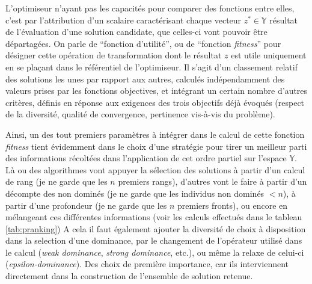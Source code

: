 L'optimiseur n'ayant pas les capacités pour comparer des fonctions entre elles, c'est par l'attribution d'un scalaire caractérisant chaque vecteur $z^* \in \mathbb{Y}$ résultat de l'évaluation d'une solution candidate, que celles-ci vont pouvoir être départagées. On parle de \enquote{fonction d'utilité}, ou de \enquote{fonction \textit{fitness}} pour désigner cette opération de transformation dont le résultat $z$ est utile uniquement en se plaçant dans le référentiel de l'optimiseur. Il s'agit d'un classement relatif des solutions les unes par rapport aux autres, calculés indépendamment des valeurs prises par les fonctions objectives, et intégrant un certain nombre d'autres critères, définis en réponse aux exigences des trois objectifs déjà évoqués (respect de la diversité, qualité de convergence, pertinence vis-à-vis du problème).

Ainsi, un des tout premiers paramètres à intégrer dans le calcul de cette fonction \textit{fitness} tient évidemment dans le choix d'une stratégie pour tirer un meilleur parti des informations récoltées dans l'application de cet ordre partiel sur l'espace $\mathbb{Y}$. Là ou des algorithmes vont appuyer la sélection des solutions à partir d'un calcul de rang (je ne garde que les $n$ premiers rangs), d'autres vont le faire à partir d'un décompte des non dominés (je ne garde que les individus non dominés $< n$), à partir d'une profondeur (je ne garde que les $n$ premiers fronts), ou encore en mélangeant ces différentes informations (voir les calculs effectués dans le tableau \ref{tab:pranking}) A cela il faut également ajouter la diversité de choix à disposition dans la selection d'une dominance, par le changement de l'opérateur utilisé dans le calcul (\textit{weak dominance}, \textit{strong dominance}, etc.), ou même la relaxe de celui-ci (\textit{epsilon-dominance}). Des choix de première importance, car ils interviennent directement dans la construction de l'ensemble de solution retenue.



